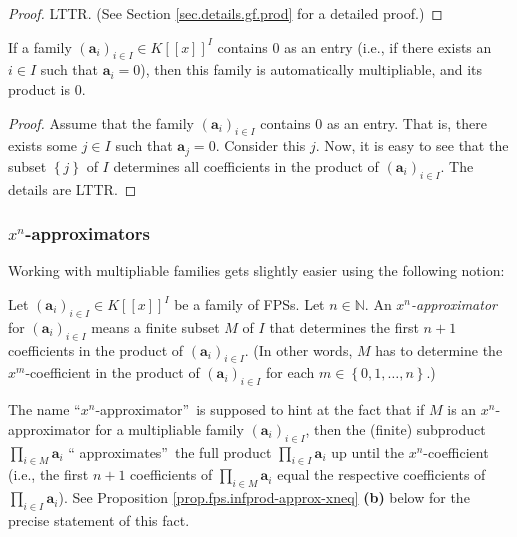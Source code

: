 \begin{proof}
LTTR. (See Section \ref{sec.details.gf.prod} for a detailed proof.)
\end{proof}

\begin{remark}
\label{rmk.fps.0-mulable}If a family $\left(  \mathbf{a}_{i}\right)  _{i\in
I}\in K\left[  \left[  x\right]  \right]  ^{I}$ contains $0$ as an entry
(i.e., if there exists an $i\in I$ such that $\mathbf{a}_{i}=0$), then this
family is automatically multipliable, and its product is $0$.
\end{remark}

\begin{proof}
Assume that the family $\left(  \mathbf{a}_{i}\right)  _{i\in I}$ contains $0$
as an entry. That is, there exists some $j\in I$ such that $\mathbf{a}_{j}=0$.
Consider this $j$. Now, it is easy to see that the subset $\left\{  j\right\}
$ of $I$ determines all coefficients in the product of $\left(  \mathbf{a}%
_{i}\right)  _{i\in I}$. The details are LTTR.
\end{proof}

\subsubsection{$x^{n}$-approximators}

Working with multipliable families gets slightly easier using the following notion:

\begin{definition}
\label{def.fps.infprod-approx}Let $\left(  \mathbf{a}_{i}\right)  _{i\in I}\in
K\left[  \left[  x\right]  \right]  ^{I}$ be a family of FPSs. Let
$n\in\mathbb{N}$. An $x^{n}$\emph{-approximator} for $\left(  \mathbf{a}%
_{i}\right)  _{i\in I}$ means a finite subset $M$ of $I$ that determines the
first $n+1$ coefficients in the product of $\left(  \mathbf{a}_{i}\right)
_{i\in I}$. (In other words, $M$ has to determine the $x^{m}$-coefficient in
the product of $\left(  \mathbf{a}_{i}\right)  _{i\in I}$ for each
$m\in\left\{  0,1,\ldots,n\right\}  $.)
\end{definition}

The name \textquotedblleft$x^{n}$-approximator\textquotedblright\ is supposed
to hint at the fact that if $M$ is an $x^{n}$-approximator for a multipliable
family $\left(  \mathbf{a}_{i}\right)  _{i\in I}$, then the (finite)
subproduct $\prod_{i\in M}\mathbf{a}_{i}$ \textquotedblleft
approximates\textquotedblright\ the full product $\prod_{i\in I}\mathbf{a}%
_{i}$ up until the $x^{n}$-coefficient (i.e., the first $n+1$ coefficients of
$\prod_{i\in M}\mathbf{a}_{i}$ equal the respective coefficients of
$\prod_{i\in I}\mathbf{a}_{i}$). See Proposition
\ref{prop.fps.infprod-approx-xneq} \textbf{(b)} below for the precise
statement of this fact.

